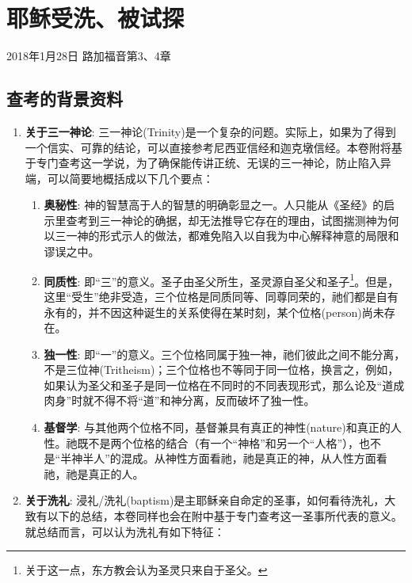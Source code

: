 \chapter{耶稣受洗、被试探}

2018年1月28日 \hfill 路加福音第3、4章



\section{查考的背景资料}

\begin{enumerate}
  \item \textbf{关于三一神论}: 三一神论(Trinity)是一个复杂的问题。实际上，如果为了得到一个信实、可靠的结论，可以直接参考尼西亚信经\cite{book:NiceneLSB}和迦克墩信经\cite{book:ChalcedonBCP}。本卷附将基于\cite{book:sproul2011trinity}专门查考这一学说，为了确保能传讲正统、无误的三一神论，防止陷入异端，可以简要地概括成以下几个要点：
  \begin{enumerate}
    \item \textbf{奥秘性}: 神的智慧高于人的智慧的明确彰显之一。人只能从《圣经》的启示里查考到三一神论的确据，却无法推导它存在的理由，试图揣测神为何以三一神的形式示人的做法，都难免陷入以自我为中心解释神意的局限和谬误之中。
    \item \textbf{同质性}: 即“三”的意义。圣子由圣父所生，圣灵源自圣父和圣子\footnote{关于这一点，东方教会认为圣灵只来自于圣父。}。但是，这里“受生”绝非受造，三个位格是同质同等、同尊同荣的，祂们都是自有永有的，并不因这种诞生的关系使得在某时刻，某个位格(person)尚未存在。
    \item \textbf{独一性}: 即“一”的意义。三个位格同属于独一神，祂们彼此之间不能分离，不是三位神(Tritheism)；三个位格也不等同于同一位格，换言之，例如，如果认为圣父和圣子是同一位格在不同时的不同表现形式，那么论及“道成肉身”时就不得不将“道”和神分离，反而破坏了独一性。
    \item \textbf{基督学}: 与其他两个位格不同，基督兼具有真正的神性(nature)和真正的人性。祂既不是两个位格的结合（有一个“神格”和另一个“人格”），也不是“半神半人”的混成。从神性方面看祂，祂是真正的神，从人性方面看祂，祂是真正的人。
  \end{enumerate}
  \item \textbf{关于洗礼}: 浸礼/洗礼(baptism)是主耶稣亲自命定的圣事，如何看待洗礼，大致有以下的总结，本卷同样也会在附中基于\cite{book:sproul2011baptism}专门查考这一圣事所代表的意义。就总结而言，可以认为洗礼有如下特征：

\end{enumerate}

